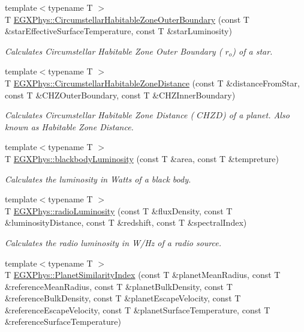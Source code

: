 \begin{DoxyCompactItemize}
{\footnotesize template$<$typename T $>$ }\\T \hyperlink{group___astrophysics_gaa47fcde814ba8007de800e930fc0a08d}{E\+G\+X\+Phys\+::\+Circumstellar\+Habitable\+Zone\+Outer\+Boundary} (const T \&star\+Effective\+Surface\+Temperature, const T \&star\+Luminosity)
\begin{DoxyCompactList}\small\item\em Calculates Circumstellar Habitable Zone Outer Boundary ( $r_o$) of a star. \end{DoxyCompactList}\item 
{\footnotesize template$<$typename T $>$ }\\T \hyperlink{group___astrophysics_gacf3a720793cdb27f6d93b170b44e81be}{E\+G\+X\+Phys\+::\+Circumstellar\+Habitable\+Zone\+Distance} (const T \&distance\+From\+Star, const T \&C\+H\+Z\+Outer\+Boundary, const T \&C\+H\+Z\+Inner\+Boundary)
\begin{DoxyCompactList}\small\item\em Calculates Circumstellar Habitable Zone Distance ( $CHZD$) of a planet. Also known as Habitable Zone Distance. \end{DoxyCompactList}\item 
{\footnotesize template$<$typename T $>$ }\\T \hyperlink{group___astrophysics_ga909f82edfaed449b44e94788b642ebb8}{E\+G\+X\+Phys\+::blackbody\+Luminosity} (const T \&area, const T \&tempreture)
\begin{DoxyCompactList}\small\item\em Calculates the luminosity in Watts of a black body. \end{DoxyCompactList}\item 
{\footnotesize template$<$typename T $>$ }\\T \hyperlink{group___astrophysics_ga6d6865b2aac1bc7c7f06b7c4ac2444e4}{E\+G\+X\+Phys\+::radio\+Luminosity} (const T \&flux\+Density, const T \&luminosity\+Distance, const T \&redshift, const T \&spectral\+Index)
\begin{DoxyCompactList}\small\item\em Calculates the radio luminosity in W/\+Hz of a radio source. \end{DoxyCompactList}\item 
{\footnotesize template$<$typename T $>$ }\\T \hyperlink{group___astrophysics_ga62e8b781c301df60bd04af3183a965eb}{E\+G\+X\+Phys\+::\+Planet\+Similarity\+Index} (const T \&planet\+Mean\+Radius, const T \&reference\+Mean\+Radius, const T \&planet\+Bulk\+Density, const T \&reference\+Bulk\+Density, const T \&planet\+Escape\+Velocity, const T \&reference\+Escape\+Velocity, const T \&planet\+Surface\+Temperature, const T \&reference\+Surface\+Temperature)

\end{DoxyCompactItemize}
